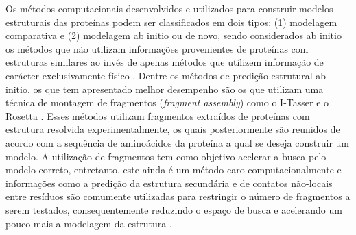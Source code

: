Os métodos computacionais desenvolvidos e utilizados para construir  modelos estruturais das proteínas podem ser classificados em dois tipos: (1) modelagem comparativa e (2) modelagem ab initio ou de novo, sendo considerados ab initio os métodos que não utilizam informações provenientes de proteínas com estruturas similares ao invés de apenas métodos que utilizem informação de carácter exclusivamente físico \cite{Helles:2003}. Dentre os métodos de predição estrutural ab initio, os que tem apresentado melhor desempenho são os que utilizam uma técnica de montagem de fragmentos (\textit{fragment assembly}) como o I-Tasser \cite{Zhang:2003} e o Rosetta \cite{Rohl:1999}. Esses métodos utilizam fragmentos extraídos de proteínas com estrutura resolvida experimentalmente, os quais posteriormente são reunidos de acordo com a sequência de aminoácidos da proteína a qual se deseja construir um modelo. A utilização de fragmentos tem como objetivo acelerar a busca pelo modelo correto, entretanto, este ainda é um método caro computacionalmente e informações como a predição da estrutura secundária e de contatos não-locais entre resíduos são comumente utilizadas para restringir o número de fragmentos a serem testados, consequentemente reduzindo o espaço de busca e acelerando um pouco mais a modelagem da estrutura \cite{Helles:2003}.

